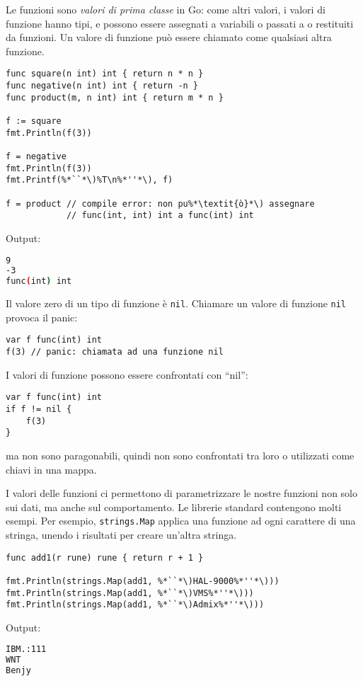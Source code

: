 Le funzioni sono \textit{valori di prima classe} in Go: come altri valori, i valori di funzione hanno tipi, e possono essere assegnati a variabili o passati a o restituiti da funzioni.
Un valore di funzione può essere chiamato come qualsiasi altra funzione.
\begin{lstlisting}[frame=single, label={lst:lstlisting4-5.1}]
func square(n int) int { return n * n }
func negative(n int) int { return -n }
func product(m, n int) int { return m * n }

f := square
fmt.Println(f(3))

f = negative
fmt.Println(f(3))
fmt.Printf(%*``*\)%T\n%*''*\), f)

f = product // compile error: non pu%*\textit{ò}*\) assegnare
            // func(int, int) int a func(int) int
\end{lstlisting}
Output:
\begin{lstlisting}[language=bash, frame=L, label={lst:lstlisting4-5.2}]
9
-3
func(int) int
\end{lstlisting}
Il valore zero di un tipo di funzione è \verb|nil|.
Chiamare un valore di funzione \verb|nil| provoca il panic:
\begin{lstlisting}[frame=single, label={lst:lstlisting4-5.3}]
var f func(int) int
f(3) // panic: chiamata ad una funzione nil
\end{lstlisting}
I valori di funzione possono essere confrontati con ``nil'':
\begin{lstlisting}[frame=single, label={lst:lstlisting4-5.4}]
var f func(int) int
if f != nil {
    f(3)
}
\end{lstlisting}
ma non sono paragonabili, quindi non sono confrontati tra loro o utilizzati come chiavi in una mappa.

I valori delle funzioni ci permettono di parametrizzare le nostre funzioni non solo sui dati, ma anche sul comportamento.
Le librerie standard contengono molti esempi.
Per esempio, \verb|strings.Map| applica una funzione ad ogni carattere di una stringa, unendo i risultati per creare un'altra stringa.
\begin{lstlisting}[frame=single, label={lst:lstlisting4-5.5}]
func add1(r rune) rune { return r + 1 }

fmt.Println(strings.Map(add1, %*``*\)HAL-9000%*''*\)))
fmt.Println(strings.Map(add1, %*``*\)VMS%*''*\)))
fmt.Println(strings.Map(add1, %*``*\)Admix%*''*\)))
\end{lstlisting}
Output:
\begin{lstlisting}[language=bash, frame=L, label={lst:lstlisting4-5.6}]
IBM.:111
WNT
Benjy
\end{lstlisting}